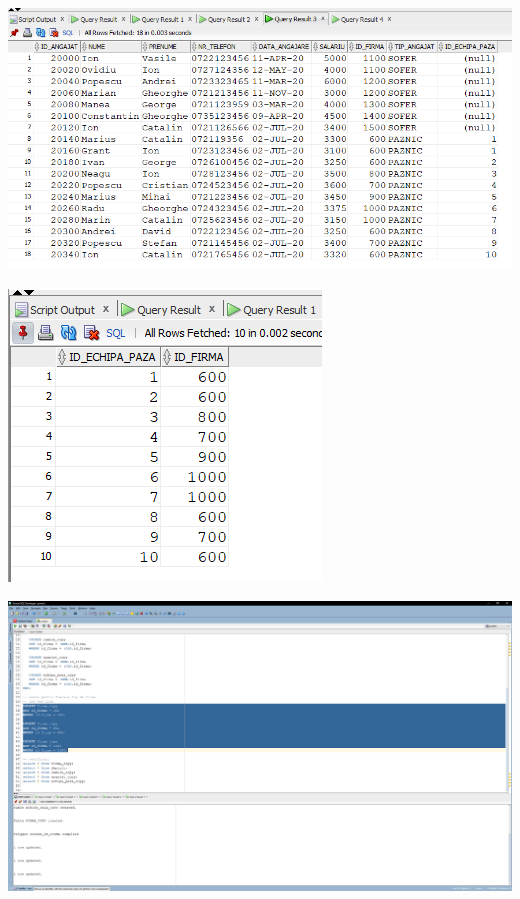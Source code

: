 \documentclass[12pt, a4paper]{article}
\begin{document}
\includegraphics[width=\textwidth]{10_5.png}

\includegraphics[width=\textwidth]{10_6.png}

\includegraphics[width=\textwidth]{10_7.png}
\end{document}
